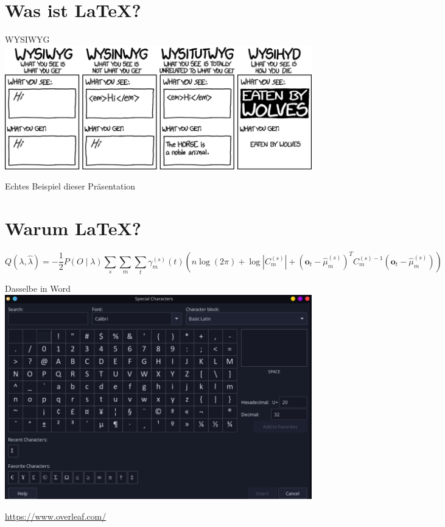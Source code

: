 \documentclass{beamer}
\begin{document}
  \section{Was ist \LaTeX?}
  \begin{frame}{WYSIWYG}
    \includegraphics[width=\textwidth]{types_of_editors_2x.png}
  \end{frame}
  \begin{frame}{Echtes Beispiel dieser Präsentation}
  \end{frame}
  \section{Warum \LaTeX?}
  \begin{frame}
\begin{dmath}
  Q(\lambda,\hat{\lambda}) = -\frac{1}{2} P{(O \mid \lambda )} \sum_s \sum_m \sum_t \gamma_m^{(s)} (t) \left( n \log(2 \pi ) + \log \left| C_m^{(s)} \right| + \left( \mathbf{o}_t - \hat{\mu}_m^{(s)} \right) ^T C_m^{(s)-1} \left(\mathbf{o}_t - \hat{\mu}_m^{(s)}\right) \right)
\end{dmath}
\end{frame}
\begin{frame}{Dasselbe in Word}
\href{https://i.makeagif.com/media/5-28-2022/dXcfrH.gif}{\includegraphics[width=\textwidth]{FormelnWord.png}}
\end{frame}
\begin{frame}
\href{Link mit einsteigerfreundlichen Informationen}{https://www.overleaf.com/}
\end{frame}
\end{document}
